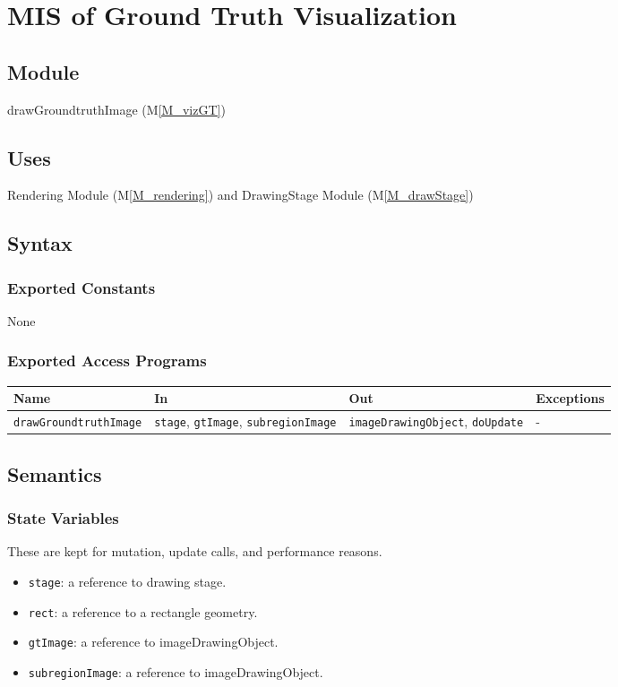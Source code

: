 \documentclass[12pt, titlepage]{article}
\newcommand{\mref}[1]{M\ref{#1}}
\newcommand{\mrefp}[1]{(\mref{#1})}
\newcommand{\mreff}[1]{Module \mrefp{#1}}
\newcommand{\code}[1]{\texttt{#1}}
\begin{document}
\newpage


\section{MIS of Ground Truth Visualization} \label{MS_vizGT}

\subsection{Module}
drawGroundtruthImage \mrefp{M_vizGT}

\subsection{Uses}
Rendering \mreff{M_rendering} and DrawingStage \mreff{M_drawStage}

\subsection{Syntax}

\subsubsection{Exported Constants}
None
\subsubsection{Exported Access Programs}

\begin{center}
\begin{tabular}{p{5cm} p{4cm} p{4cm} p{2cm}}
\hline
\textbf{Name} & \textbf{In} & \textbf{Out} & \textbf{Exceptions} \\
\hline
\code{drawGroundtruthImage} & \code{stage}, \code{gtImage}, \code{subregionImage}
  & \code{imageDrawingObject}, \code{doUpdate} & - \\
\hline
\end{tabular}
\end{center}

\subsection{Semantics}

\subsubsection{State Variables}
These are kept for mutation, update calls, and performance reasons.
\begin{itemize}
  \item \code{stage}: a reference to drawing stage.
  \item \code{rect}: a reference to a rectangle geometry.
  \item \code{gtImage}: a reference to imageDrawingObject.
  \item \code{subregionImage}: a reference to imageDrawingObject.
\end{itemize}
\end{document}
